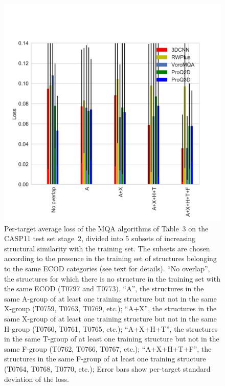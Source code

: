 \documentclass[letter,10pt]{article}
\begin{document}
\begin{figure}[H]
    \centering
    \includegraphics[width=\linewidth]{Fig/LossVsECOD.png}
%
    \caption{Per-target average loss of the MQA algorithms of Table~3
    on the CASP11 test set stage~2, divided into 5 subsets of
    increasing structural similarity with the training set. The
    subsets are chosen according to the presence in the training set
    of structures belonging to the same ECOD categories (see text for
    details). 
    ``No overlap'', the structures for which there is no structure in the training set with 
    the same ECOD (T0797 and T0773). 
    ``A'', the structures in the same A-group of at least one training
    structure but not in the same X-group (T0759, T0763, T0769, etc.); 
    ``A+X'', the structures in the same X-group of at least one training
    structure but not in the same H-group (T0760, T0761, T0765, etc.);
    ``A+X+H+T'', the structures in the same T-group of at least one
    training structure but not in the same F-group (T0762, T0766, T0767,
    etc.);
    ``A+X+H+T+F'', the structures in the same F-group of at least one
    training structure (T0764, T0768, T0770, etc.);
    Error bars show per-target standard deviation of the loss.}
%
    \label{Fig:LossVsECOD}
\end{figure}
\end{document}
